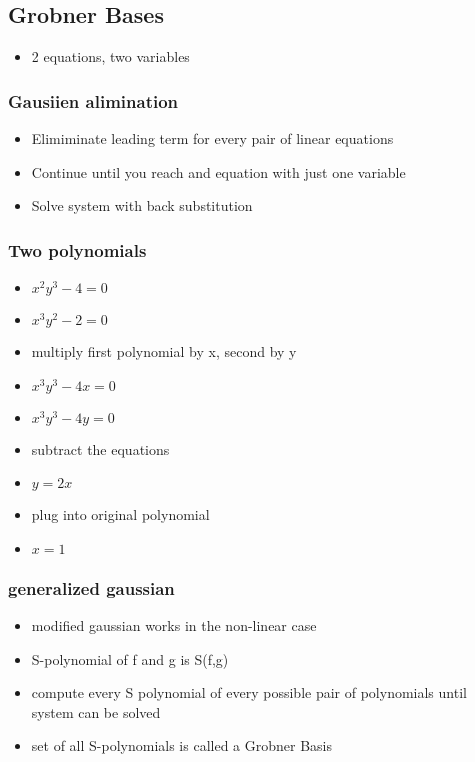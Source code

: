 \documentclass[11pt]{article}
\begin{document}
\subsection*{Grobner Bases}
\label{sec:org072961a}
\begin{itemize}
\item 2 equations, two variables
\end{itemize}
\subsubsection*{Gausiien alimination}
\label{sec:org47b6ef0}
\begin{itemize}
\item Elimiminate leading term for every pair of linear equations
\item Continue until you reach and equation with just one variable
\item Solve system with back substitution
\end{itemize}
\subsubsection*{Two polynomials}
\label{sec:orgc2e3c98}
\begin{itemize}
\item \(x^2y^3 - 4 = 0\)
\item \(x^3y^2 - 2 = 0\)
\item multiply first polynomial by x, second by y
\item \(x^3y^3 - 4x = 0\)
\item \(x^3y^3 - 4y = 0\)
\item subtract the equations
\item \(y = 2x\)
\item plug into original polynomial
\item \(x = 1\)
\end{itemize}
\subsubsection*{generalized gaussian}
\label{sec:orga09129c}
\begin{itemize}
\item modified gaussian works in the non-linear case
\item S-polynomial of f and g is S(f,g)
\item compute every S polynomial of every possible pair of polynomials until system
can be solved
\item set of all S-polynomials is called a Grobner Basis
\end{itemize}
\end{document}

